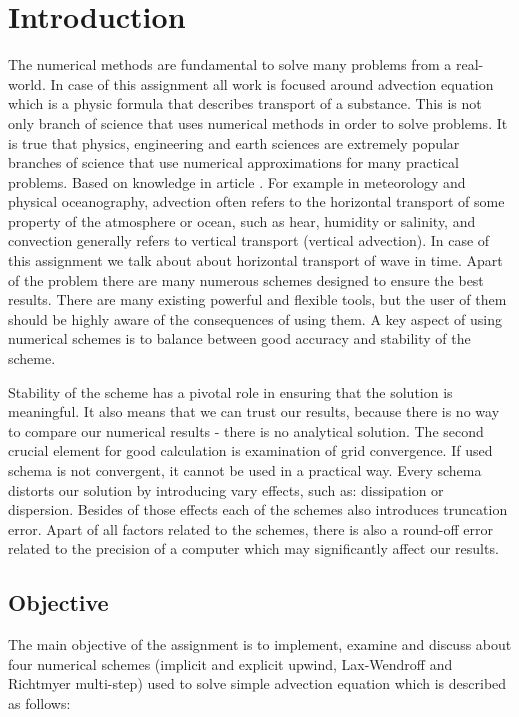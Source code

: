 \chapter{Introduction} \label{sec:Intoduction}
	The numerical methods are fundamental to solve many problems from a real-world. In case of this assignment all work is focused around advection equation which is a physic formula that describes transport of a substance. This is not only branch of science that uses numerical methods in order to solve problems. It is true that physics, engineering and earth sciences are extremely popular branches of science that use numerical approximations for many practical problems. Based on knowledge in article \cite{bib:advection}. For example in meteorology and physical oceanography, advection often refers to the horizontal transport of some property of the atmosphere or ocean, such as hear, humidity or salinity, and convection generally refers to vertical transport (vertical advection). In case of this assignment we talk about about horizontal transport of wave in time. Apart of the problem there are many numerous schemes designed to ensure the best results. There are many existing powerful and flexible tools, but the user of them should be highly aware of the consequences of using them. A key aspect of using numerical schemes is to balance between good accuracy and stability of the scheme.
	
	Stability of the scheme has a pivotal role in ensuring that the solution is meaningful. It also means that we can trust our results, because there is no way to compare our numerical results - there is no analytical solution. The second crucial element for good calculation is examination of grid convergence. If used schema is not convergent, it cannot be used in a practical way. Every schema distorts our solution by introducing vary effects, such as: dissipation or dispersion. Besides of those effects each of the schemes also introduces truncation error. Apart of all factors related to the schemes, there is also a round-off error related to the precision of a computer which may significantly affect our results.
	
	\section{Objective} \label{sec:Objective}
		The main objective of the assignment is to implement, examine and discuss about four numerical schemes (implicit and explicit upwind, Lax-Wendroff and Richtmyer multi-step) used to solve simple advection equation which is described as follows:
		
